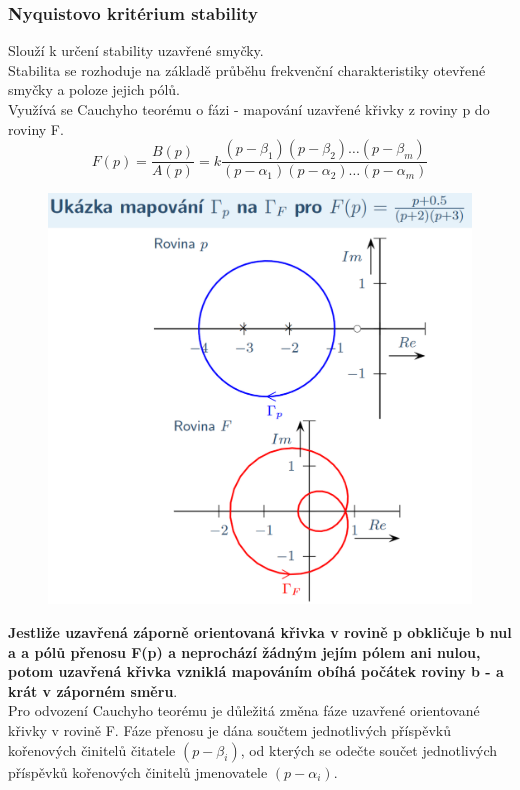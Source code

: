 \subsubsection*{Nyquistovo kritérium stability}
Slouží k určení stability uzavřené smyčky.\\
Stabilita se rozhoduje na základě průběhu frekvenční charakteristiky otevřené smyčky a poloze jejich pólů.\\
Využívá se Cauchyho teorému o fázi - mapování uzavřené křivky z roviny p do roviny F.\\
\begin{equation}
    F(p) = \frac{B(p)}{A(p)} = k\frac{(p-\beta_1)(p-\beta_2)\dots (p-\beta_m)}{(p-\alpha_1)(p-\alpha_2)\dots (p-\alpha_m)}
\end{equation}
\begin{figure}[H]
    \includegraphics*[scale = 0.3]{images/NyQuistMapovani.png}
\end{figure}
\textbf{Jestliže uzavřená záporně orientovaná křivka v rovině p obkličuje b nul a a pólů přenosu F(p) a neprochází žádným jejím pólem ani nulou, potom uzavřená křivka vzniklá mapováním obíhá počátek roviny b - a krát v záporném směru}.\\
Pro odvození Cauchyho teorému je důležitá změna fáze uzavřené orientované křivky v rovině F. Fáze přenosu je dána součtem jednotlivých příspěvků kořenových činitelů čitatele $(p - \beta_i)$, od  kterých se odečte součet jednotlivých příspěvků kořenových činitelů jmenovatele $(p - \alpha_i)$.\\
\newpage

